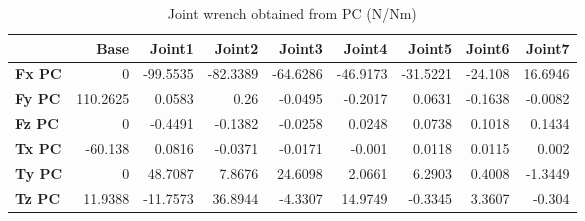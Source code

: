 \begin{table}[h!]
	\centering
	\caption{Joint wrench obtained from PC (N/Nm)}
	\label{wrech_PC_Pose12}
	\begin{tabular}{|l|r|r|r|r|r|r|r|r|}
		\hline
		\textbf{}  & \textbf{Base} & \textbf{Joint1}  & \textbf{Joint2}  & \textbf{Joint3}  & \textbf{Joint4}  & \textbf{Joint5}  & \textbf{Joint6}  & \textbf{Joint7} \\ \hline
		\textbf{Fx PC}  & 0        & -99.5535        & -82.3389        & -64.6286        & -46.9173        & -31.5221        & -24.108        & 16.6946 \\ \hline
		\textbf{Fy PC}  & 110.2625        & 0.0583        & 0.26        & -0.0495        & -0.2017        & 0.0631        & -0.1638        & -0.0082 \\ \hline
		\textbf{Fz PC}  & 0        & -0.4491        & -0.1382        & -0.0258        & 0.0248        & 0.0738        & 0.1018        & 0.1434 \\ \hline
		\textbf{Tx PC}  & -60.138        & 0.0816        & -0.0371        & -0.0171        & -0.001        & 0.0118        & 0.0115        & 0.002 \\ \hline
		\textbf{Ty PC}  & 0        & 48.7087        & 7.8676        & 24.6098        & 2.0661        & 6.2903        & 0.4008        & -1.3449 \\ \hline
		\textbf{Tz PC}  & 11.9388        & -11.7573        & 36.8944        & -4.3307        & 14.9749        & -0.3345        & 3.3607        & -0.304 \\ \hline
	\end{tabular}
\end{table}

